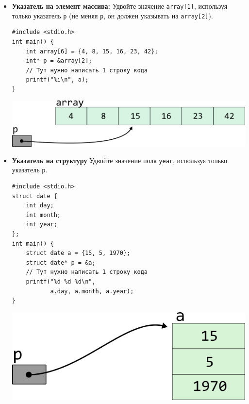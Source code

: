 \documentclass{article}
\begin{document}
\begin{itemize}
\begin{multicols}{2}
\end{multicols}


\item \textbf{Указатель на элемент массива:} Удвойте значение \texttt{array[1]}, используя только указатель \texttt{p} (не меняя \texttt{p}, он должен указывать на \texttt{array[2]}).
\begin{multicols}{2}
\begin{lstlisting}
#include <stdio.h>
int main() {
    int array[6] = {4, 8, 15, 16, 23, 42};
    int* p = &array[2];
    // Тут нужно написать 1 строку кода
    printf("%i\n", a);
}
\end{lstlisting}
\columnbreak

\hfill \break
\begin{center}
\includegraphics[scale=0.70]{../images/pointer_schemes/pointer_to_array_of_ints.png}
\end{center}
\hfill \break
\end{multicols}

\newpage
\item \textbf{Указатель на структуру} Удвойте значение поля \texttt{year}, используя только указатель \texttt{p}.
\begin{multicols}{2}
\begin{lstlisting}
#include <stdio.h>
struct date {
    int day;
    int month;
    int year;
};
int main() {
    struct date a = {15, 5, 1970};
    struct date* p = &a;
    // Тут нужно написать 1 строку кода
    printf("%d %d %d\n", 
           a.day, a.month, a.year);
}
\end{lstlisting}
\columnbreak

\hfill \break
\includegraphics[scale=1]{../images/pointer_schemes/pointer_to_struct_date.png}
\hfill \break

\end{multicols}

\end{itemize}
\end{document}
